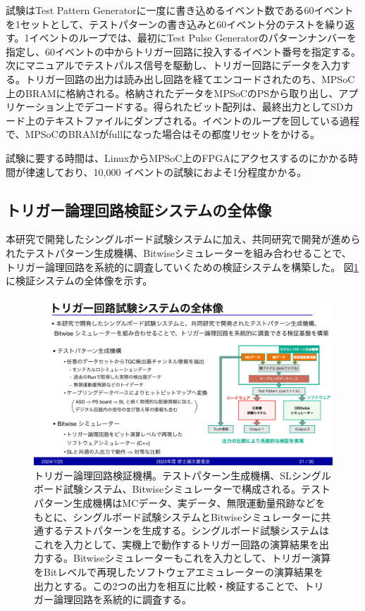 試験はTest Pattern Generatorに一度に書き込めるイベント数である60イベントを1セットとして、テストパターンの書き込みと60イベント分のテストを繰り返す。1イベントのループでは、最初にTest Pulse Generatorのパターンナンバーを指定し、60イベントの中からトリガー回路に投入するイベント番号を指定する。次にマニュアルでテストパルス信号を駆動し、トリガー回路にデータを入力する。トリガー回路の出力は読み出し回路を経てエンコードされたのち、MPSoC上のBRAMに格納される。格納されたデータをMPSoCのPSから取り出し、アプリケーション上でデコードする。得られたビット配列は、最終出力としてSDカード上のテキストファイルにダンプされる。イベントのループを回している過程で、MPSoCのBRAMがfullになった場合はその都度リセットをかける。

試験に要する時間は、LinuxからMPSoC上のFPGAにアクセスするのにかかる時間が律速しており、10,000 イベントの試験におよそ1分程度かかる。

\subsection{トリガー論理回路検証システムの全体像}
\label{subsec_TestSystemOverview}
本研究で開発したシングルボード試験システムに加え、共同研究\cite{mt_yamashita}で開発が進められたテストパターン生成機構、Bitwiseシミュレーターを組み合わせることで、トリガー論理回路を系統的に調査していくための検証システムを構築した。
図\ref{Test_system}に検証システムの全体像を示す。

\begin{figure} 
\centering
\includegraphics[width=16cm]{fig/Test/Test_system.pdf}
\caption[トリガー論理回路検証機構]{トリガー論理回路検証機構。テストパターン生成機構、SLシングルボード試験システム、Bitwiseシミュレーターで構成される。テストパターン生成機構はMCデータ、実データ、無限運動量飛跡などをもとに、シングルボード試験システムとBitwiseシミュレーターに共通するテストパターンを生成する。シングルボード試験システムはこれを入力として、実機上で動作するトリガー回路の演算結果を出力する。Bitwiseシミュレーターもこれを入力として、トリガー演算をBitレベルで再現したソフトウェアエミュレーターの演算結果を出力とする。この2つの出力を相互に比較・検証することで、トリガー論理回路を系統的に調査する。}
\label{Test_system}
\end{figure}

